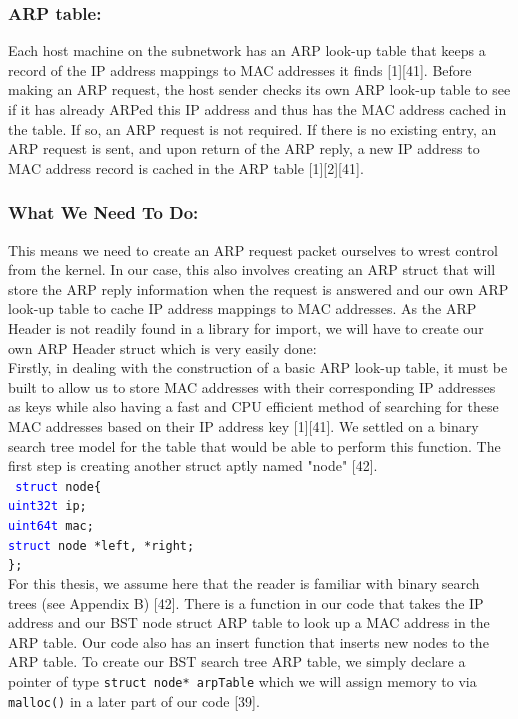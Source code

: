 \documentclass{uathesis}
\begin{document}
\subsubsection*{ARP table:}
Each host machine on the subnetwork has an ARP look-up table that keeps a record of the IP address mappings to MAC addresses it finds [1][41]. Before making an ARP request, the host sender checks its own ARP look-up table to see if it has already ARPed this IP address and thus has the MAC address cached in the table. If so, an ARP request is not required. If there is no existing entry, an ARP request is sent, and upon return of the ARP reply, a new IP address to MAC address record is cached in the ARP table [1][2][41].\\

\subsubsection*{What We Need To Do:}
This means we need to create an ARP request packet ourselves to wrest control from the kernel. In our case, this also involves creating an ARP struct that will store the ARP reply information when the request is answered and our own ARP look-up table to cache IP address mappings to MAC addresses. As the ARP Header is not readily found in a library for import, we will have to create our own ARP Header struct which is very easily done: \\

Firstly, in dealing with the construction of a basic ARP look-up table, it must be built to allow us to store MAC addresses with their corresponding IP addresses as keys while also having a fast and CPU efficient method of searching for these MAC addresses based on their IP address key [1][41]. We settled on a binary search tree model for the table that would be able to perform  this function. The first step is creating another struct aptly named "node" [42]. \\
{\tt
\textcolor{blue}{struct} node\big\{\\
\hphantom{structarp} \textcolor{blue}{uint32\textunderscore t}\hphantom{htyi} ip;\\
\hphantom{structarp} \textcolor{blue}{uint64\textunderscore t} \hphantom{hty} mac;\\
\hphantom{structarp} \textcolor{blue}{struct}\hphantom{htynod} node *left, *right;\\
\indent\big\};}\\
 

For this thesis, we assume here that the reader is familiar with binary search trees (see Appendix B) [42]. There is a function in our code that takes the IP address and our BST node struct ARP table to look up a MAC address in the ARP table. Our code also has an insert function that inserts new nodes to the ARP table. To create our BST search tree ARP table, we simply declare a pointer of type {\tt struct node* arpTable} which we will assign memory to via {\tt malloc()} in a later part of our code [39].
\end{document}
